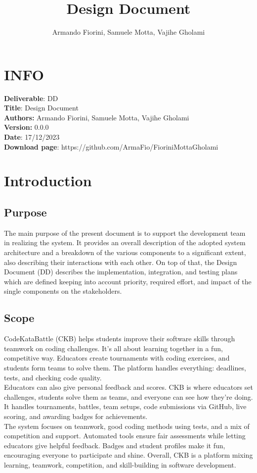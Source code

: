 \documentclass{article}
\title{\textbf{Design Document}}
\author{Armando Fiorini, Samuele Motta, Vajihe Gholami}
\date{}
\begin{document}
\maketitle
\section*{INFO}
\textbf{Deliverable}: DD\\
\textbf{Title}: Design Document\\
\textbf{Authors:} Armando Fiorini, Samuele Motta, Vajihe Gholami\\
\textbf{Version:} 0.0.0\\
\textbf{Date}: 17/12/2023\\
\textbf{Download page}: https://github.com/ArmaFio/FioriniMottaGholami\\
\newpage
\tableofcontents
\newpage

\section{Introduction}
\subsection{Purpose}
The main purpose of the present document is to support the development team in realizing the system. It provides an overall description of the adopted system architecture and a breakdown of the various components to a significant extent, also describing their interactions with each other. On top of that, the Design Document (DD) describes the implementation, integration, and testing plans which are defined keeping into account priority, required effort, and impact of the single components on the stakeholders.

\subsection{Scope}
CodeKataBattle (CKB) helps students improve their software skills through teamwork on coding challenges. It's all about learning together in a fun, competitive way. Educators create tournaments with coding exercises, and students form teams to solve them. The platform handles everything: deadlines, tests, and checking code quality. \\
Educators can also give personal feedback and scores. CKB is where educators set challenges, students solve them as teams, and everyone can see how they're doing. It handles tournaments, battles, team setups, code submissions via GitHub, live scoring, and awarding badges for achievements. \\
The system focuses on teamwork, good coding methods using tests, and a mix of competition and support. Automated tools ensure fair assessments while letting educators give helpful feedback. Badges and student profiles make it fun, encouraging everyone to participate and shine. Overall, CKB is a platform mixing learning, teamwork, competition, and skill-building in software development.
\end{document}
